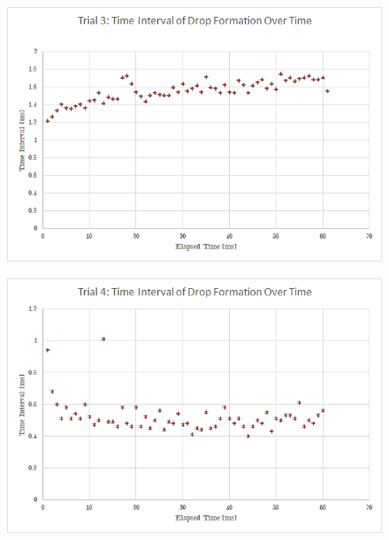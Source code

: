 \documentclass[a4paper]{article}
\begin{document}
\begin{figure}[H]
\centering
\begin{minipage}{.5\textwidth}
  \centering
  \includegraphics[width=\linewidth]{sink3.png}
  \label{fig:test3}
\end{minipage}%
\begin{minipage}{.5\textwidth}
  \centering
  \includegraphics[width=\linewidth]{sink4.png}
  \label{fig:test4}
\end{minipage}
\end{figure}
\end{document}
